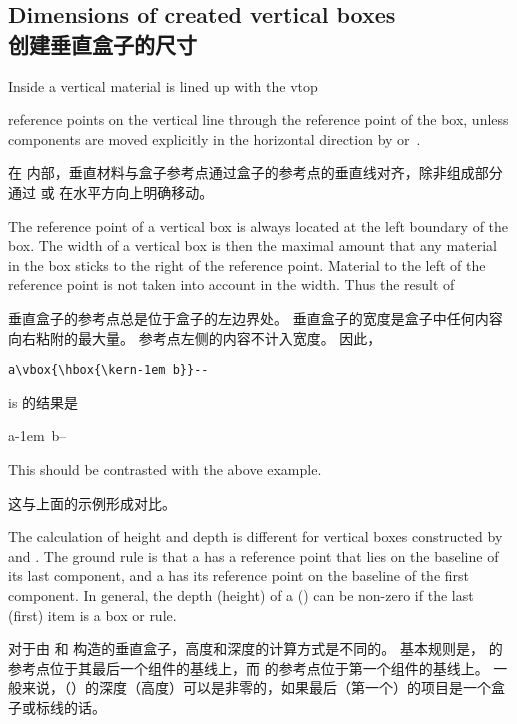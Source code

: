 \subsection{Dimensions of created vertical boxes\\创建垂直盒子的尺寸}

Inside a  vertical material is lined up with the
\cstoidx vtop\par
reference points on the vertical line through the reference
point of the box,
unless components are moved explicitly in the horizontal direction
by  or~.

在  内部，垂直材料与盒子参考点通过盒子的参考点的垂直线对齐，除非组成部分通过  或  在水平方向上明确移动。

The  reference point of a vertical box
is always located at the left boundary of the box.
The width of a vertical box
is then the maximal amount that any material in the
box sticks to the right of the reference point.
Material to the left of the reference point is
not taken into account in the width.
Thus the result of

垂直盒子的参考点总是位于盒子的左边界处。
垂直盒子的宽度是盒子中任何内容向右粘附的最大量。
参考点左侧的内容不计入宽度。
因此，
\begin{disp}\verb>a\vbox{\hbox{\kern-1em b}}-->\end{disp}
is 的结果是
\begin{disp}\leavevmode\hphantom{b}a\vbox{\hbox{\kern-1em b}}--\end{disp}
This should be contrasted with the above example.

这与上面的示例形成对比。


The calculation of height and depth is different
for vertical boxes constructed by  and .
The ground rule is that
\awp
a  has a reference point that lies on
the baseline of its last component,
and a  has its reference point on the baseline of the
first component.
In general, the depth (height) of a  ()
\alt
can be non-zero if the last (first) item is a box or rule.

对于由  和  构造的垂直盒子，高度和深度的计算方式是不同的。
基本规则是， 的参考点位于其最后一个组件的基线上，而  的参考点位于第一个组件的基线上。
一般来说，（）的深度（高度）可以是非零的，如果最后（第一个）的项目是一个盒子或标线的话。



